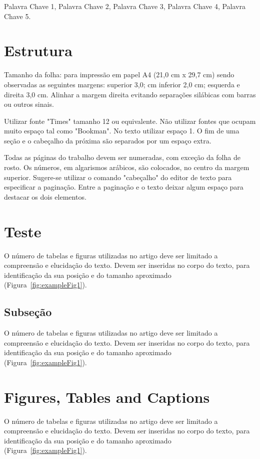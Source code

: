 \documentclass[a4paper]{article}
\begin{document}
\begin{keywords}
    Palavra Chave 1, Palavra Chave 2, Palavra Chave 3, Palavra Chave 4, Palavra Chave 5.
\end{keywords}

\section{Estrutura}

Tamanho da folha: para  impressão em papel  A4 (21,0 cm x 29,7 cm) sendo observadas as seguintes margens: superior 3,0; cm inferior 2,0 cm; esquerda e direita 3,0 cm. Alinhar a margem direita evitando separações silábicas com barras ou outros sinais.

Utilizar fonte "Times" tamanho 12 ou equivalente. Não utilizar fontes que ocupam muito espaço tal como "Bookman".  No texto utilizar espaço 1.  O fim de uma seção e o cabeçalho da próxima são separados por um espaço extra.

Todas as páginas do trabalho devem ser numeradas, com exceção da folha de rosto.  Os números, em algarismos arábicos, são colocados, no centro da margem superior. Sugere-se utilizar o comando "cabeçalho" do editor de texto para especificar a paginação. Entre a paginação e o texto deixar algum espaço para destacar os dois elementos. 

\section{Teste}
O número de tabelas e figuras utilizadas no artigo deve ser limitado a compreensão e elucidação do texto. Devem ser inseridas no corpo do texto, para identificação da sua posição e do tamanho aproximado (Figura~\ref{fig:exampleFig1}).

\subsection{Subseção}
O número de tabelas e figuras utilizadas no artigo deve ser limitado a compreensão e elucidação do texto. Devem ser inseridas no corpo do texto, para identificação da sua posição e do tamanho aproximado (Figura~\ref{fig:exampleFig1}).

\section{Figures, Tables and Captions}\label{sec:figs}

O número de tabelas e figuras utilizadas no artigo deve ser limitado a compreensão e elucidação do texto. Devem ser inseridas no corpo do texto, para identificação da sua posição e do tamanho aproximado (Figura~\ref{fig:exampleFig1}).
\end{document}
